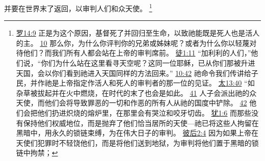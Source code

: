 \documentclass[12pt, a4paper, oneside]{ctexart}
\begin{document}
	并要在世界末了返回，以审判人们和众天使。
	\footnote {
		\href{https://biblehub.com/romans/14-9.htm}{罗14:9} 正是为这个原因，基督死了并回归至生命，以致祂能既是死人也是活人的主。
		\href{https://biblehub.com/romans/14-10.htm}{10} 那么你，为什么你评判你的兄弟或姊妹呢？或者为什么你以轻蔑对待他们？而我们所有人都会站在上帝的审判席前。
		\href{https://biblehub.com/acts/1-11.htm}{徒1:11} “加利利的人们，”他们说，“你们为什么站在这里看寻天空呢？这同一位耶稣，已从你们那被升进天国，会以你们看到祂进入天国同样的方法回来。”
		\href{https://biblehub.com/acts/10-42.htm}{10:42} 祂命令我们传讲给子民，并作祂是上帝指定作活人和死人的审判者的那一位的见证。
		\href{https://biblehub.com/matthew/13-40.htm}{太13:40} “如杂草被拔起并在火中燃烧，在时代的末了也会是如此。
		\href{https://biblehub.com/matthew/13-41.htm}{41} 人子会派出祂的众天使，而他们会将导致罪恶的一切和作恶的所有人从祂的国度中铲除。
		\href{https://biblehub.com/matthew/13-42.htm}{42} 他们会把他们扔进炽烧的熔炉里，在那里会有哭泣和咬牙切齿。
		\href{https://biblehub.com/jude/1-6.htm}{犹1:6} 而那些没有保持他们权威地位，而是抛弃了他们恰当居所的天使---祂已将这些人拘留在黑暗中，用永久的锁链束缚，为在伟大日子的审判。
		\href{https://biblehub.com/2_peter/2-4.htm}{彼后2:4} 因为如果上帝在天使们犯罪时不轻饶他们，而是将他们送到地狱，为审判将他们置于黑暗的锁链中拘禁；
	}
\end{document}
